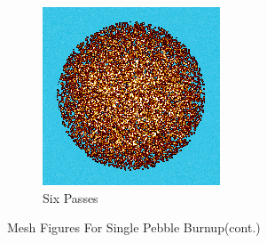 \begin{figure}[H]
\begin{subfigure}{0.4\textwidth}
  \includegraphics[width=0.95\linewidth]{figures/burn-20-bstep6}
  \caption{Six Passes}
  \label{fig:bstep6}
\end{subfigure}%
%
\caption{Mesh Figures For Single Pebble Burnup(cont.)}
\label{fig:burn-meshes}
\end{figure}